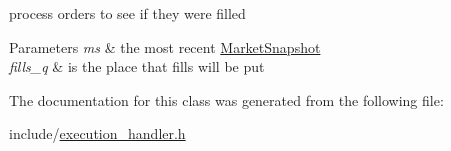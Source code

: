 process orders to see if they were filled 


\begin{DoxyParams}{Parameters}
{\em ms} & the most recent \hyperlink{classMarketSnapshot}{Market\+Snapshot} \\
\hline
{\em fills\+\_\+q} & is the place that fills will be put \\
\hline
\end{DoxyParams}


The documentation for this class was generated from the following file\+:\begin{DoxyCompactItemize}
\item 
include/\hyperlink{execution__handler_8h}{execution\+\_\+handler.\+h}\end{DoxyCompactItemize}
